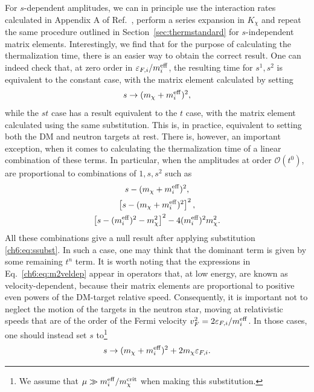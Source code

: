  For $s$-dependent amplitudes, we can in principle use the interaction rates calculated  in Appendix A of Ref.~\cite{Bell:2020lmm_mar_ImprovedTreatmentDark}, perform a series expansion in $K_\chi$  and repeat the same procedure outlined in Section~\ref{sec:thermstandard} for $s$-independent matrix elements. Interestingly, we find that for the purpose of calculating the thermalization time, there is an easier way to obtain the correct result. One can indeed check that, at zero order in $\varepsilon_{F,i}/m_i^{\rm eff}$, the resulting time for $s^1, s^2$ is equivalent to the constant case, with the matrix element calculated by setting 
\begin{equation}
    s\rightarrow (m_\chi+m_i^{\rm eff})^2,
    \label{ch6:eq:ssubst}
\end{equation}
while the $s t $ case has a result equivalent to the $t$ case, with the matrix element calculated using the same substitution. This is, in practice, equivalent to setting both the DM and neutron targets at rest. There is, however, an important exception, when it comes to calculating the thermalization time of a linear combination of these terms. In particular, when the amplitudes at order $\mathcal{O}(t^0)$, are proportional to combinations of $1,s,s^2$ such as
\begin{gather}
s-(m_\chi+m_i^{\rm eff})^2,\nonumber\\
\left[s-(m_\chi+m_i^{\rm eff})^2\right]^2,\nonumber\\
\left[s-(m_i^{\rm eff})^2-m_\chi^2\right]^2-4(m_i^{\rm eff})^2 m_\chi^2.\label{ch6:eq:m2veldep}
\end{gather}
All these combinations give a null result after applying substitution \ref{ch6:eq:ssubst}. In such a case, one may think that the dominant term is given by some remaining $t^n$ term. It is worth noting that the expressions in  Eq.~\ref{ch6:eq:m2veldep}  appear in operators that, at low energy, are known as  velocity-dependent, because their matrix elements are proportional to positive even powers of the DM-target relative speed. Consequently, it is important not to neglect the motion of the targets in the neutron star, moving at relativistic speeds that are of the order of the Fermi velocity $v_F^2=2\varepsilon_{F,i}/m_i^{\rm eff}$. In those cases, one should instead set $s$ to\footnote{We assume that $\mu\gg m_i^{\rm eff}/m_\chi^{\rm crit}$ when making this substitution.}
\begin{equation}
    s\rightarrow (m_\chi+m_i^{\rm eff})^2+2m_\chi\varepsilon_{F,i}.
    \label{ch6:eq:ssubstmu}
\end{equation}



